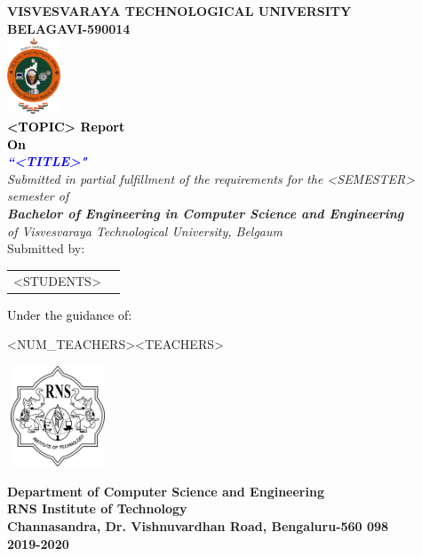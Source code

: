 \thispagestyle{empty}
\begin{titlepage}
\begin{center}
\textup{\large{\textcolor{darkbrown}{\bf VISVESVARAYA TECHNOLOGICAL UNIVERSITY} \\ {\textcolor{darkbrown}{\bf BELAGAVI-590014}}}}\\
\includegraphics[width=0.12\textwidth]{./../static/media/VTU.png}\\
\textup{\small{\textcolor{black}{\textbf{<TOPIC> Report} \\ {\textbf{On}}}}} \\
\textup{\large{\textcolor{blue}{\textbf{\textit{``<TITLE>"}}}}} \\[0.2in]

\textup{{\textit {Submitted in partial fulfillment of the requirements for the <SEMESTER> semester of} \\ {\textbf {\textit {Bachelor of Engineering in Computer Science and Engineering}} \\ \textit {of Visvesvaraya Technological University, Belgaum}}}}\\

\textup{Submitted by:} 
\break\break
\begin{tabular}{l l}<STUDENTS>
\end{tabular}
\break\break
\textup{\normalsize{\textcolor{black}{ Under the guidance of:}}}\break\break
\renewcommand\tabularxcolumn[1]{>{\Centering}p{#1}}
\begin{tabularx}{\linewidth}{<NUM_TEACHERS>}<TEACHERS>
\end{tabularx}
\renewcommand\tabularxcolumn[1]{}
\vfill
\includegraphics[width=3cm, height=3cm]{../static/media/RNS_logo.png}

\textup{\normalsize {\textcolor{darkbrown}{\bf Department of Computer Science and Engineering} \\ {\textcolor{darkbrown}{\bf \bf{RNS Institute of Technology}}}}}\\
\textup{\small {\textcolor{darkbrown}{\bf Channasandra, Dr. Vishnuvardhan Road, Bengaluru-560 098}\\ \textbf {\textcolor{darkbrown}{2019-2020}}}}
\end{center}
\end{titlepage}
\vfill
\pagebreak